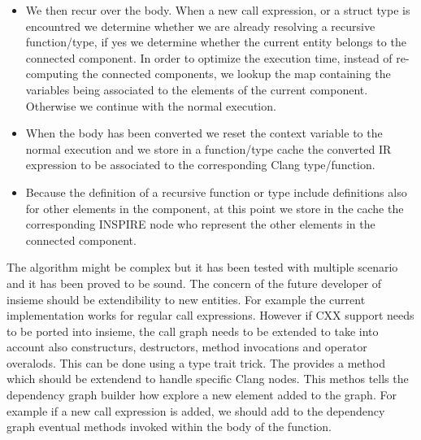 \begin{description}
\begin{itemize}
	\item We then recur over the body. When a new call expression, or a struct
		type is encountred we determine whether we are already resolving a
		recursive function/type, if yes we determine whether the current
		entity belongs to the connected component. In order to optimize the
		execution time, instead of re-computing the connected components, we
		lookup the map containing the variables being associated to the elements
		of the current component. Otherwise we continue with the normal
		execution. 

	\item When the body has been converted we reset the context variable to the
		normal execution and we store in a function/type cache the converted
		IR expression to be associated to the corresponding Clang type/function.

	\item Because the definition of a recursive function or type include
		definitions also for other elements in the component, at this point we
		store in the cache the corresponding INSPIRE node who represent the
		other elements in the connected component. 

\end{itemize}

\end{description}

The algorithm might be complex but it has been tested with multiple scenario and
it has been proved to be sound. The concern of the future developer of insieme
should be extendibility to new entities. For example the current implementation
works for regular call expressions. However if CXX support needs to be ported
into insieme, the call graph needs to be extended to take into account also
constructurs, destructors, method invocations and operator overalods. This can
be done using a type trait trick. The 
provides a  method which should be extendend to handle specific
Clang nodes. This methos tells the dependency graph builder how explore a new
element added to the graph. For example if a new call expression is added, we
should add to the dependency graph eventual methods invoked within the body of
the function. 

